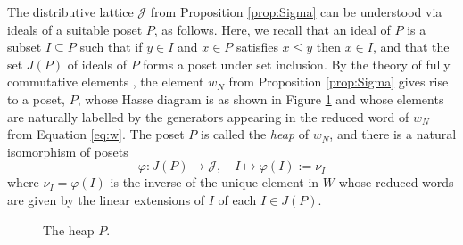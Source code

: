 \documentclass[10pt,a4paper]{amsart}
\numberwithin{equation}{section}
\newcommand{\ra}{\rightarrow}
\newcommand{\wnn}{w_{N}}
\newcommand{\calj}{\mathcal{J}}
\newcommand{\se}{\subseteq}
\begin{document}
The distributive lattice $\calj$ from Proposition \ref{prop:Sigma} can be
understood via ideals of a suitable poset $P$, as follows. Here, we recall that
an ideal of $P$ is a subset $I\se P$ such that if $y\in I$ and $x\in P$
satisfies $x\le y$ then $x\in I$, and that the set $J(P)$ of ideals of $P$ forms
a poset under set inclusion. By the theory of fully commutative elements
\cite[Section 2.2,  Theorem 3.2]{FC}, the element $\wnn$ from Proposition
\ref{prop:Sigma} gives rise to a poset, $P$,
whose Hasse diagram is as shown in Figure \ref{fig:heap} and whose elements are
naturally labelled by the generators appearing in the reduced word of $\wnn$ from
Equation \eqref{eq:w}. The poset $P$ is called the \emph{heap} of $\wnn$, and there is a natural isomorphism of posets 
\begin{equation}
\label{eq:ideal_to_elt}
\varphi: J(P)\ra \calj, \quad I\mapsto \varphi(I):=\nu_I
\end{equation}
where $\nu_I= \varphi(I)$ is the inverse of the unique element in $W$ whose
reduced words are
given by the linear extensions of $I$ of each $I\in J(P)$.

\begin{figure}[h!]
    \caption{The heap $P$.}
    \label{fig:heap}
\end{figure}
\end{document}
